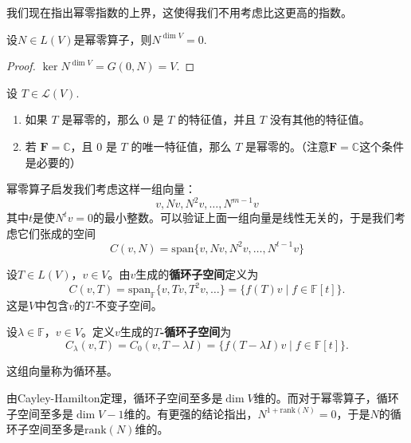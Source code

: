 我们现在指出幂零指数的上界，这使得我们不用考虑比这更高的指数。

\begin{theorem}[幂零指数的上界]
设$N \in L(V)$是幂零算子，则$N^{\dim V}=0$.
\end{theorem}

\begin{proof}
    $\ker N^{\dim V}=G(0, N)=V$.
\end{proof}
\begin{theorem}[幂零算子的特征值]
设 $T \in \mathcal{L}(V)$.

\begin{enumerate}
    \item[1.] 如果 $T$ 是幂零的，那么 $0$ 是 $T$ 的特征值，并且 $T$ 没有其他的特征值。
    \item[2.] 若 $\mathbf{F} = \mathbb{C}$，且 $0$ 是 $T$ 的唯一特征值，那么 $T$ 是幂零的。（注意$\mathbf{F} = \mathbb{C}$这个条件是必要的）
\end{enumerate}
\end{theorem}

幂零算子启发我们考虑这样一组向量：
\[
v,Nv,N^2v,\ldots,N^{m-1} v
\]
其中$t$是使$N^t v=0$的最小整数。可以验证上面一组向量是线性无关的，于是我们考虑它们张成的空间
\[
C(v,N)=\mathrm{span}\{v,Nv,N^2v,\ldots,N^{t-1}v\}
\]
\begin{definition}[循环子空间与循环模]
设$T \in L(V)$，$v \in V$。由$v$生成的\textbf{循环子空间}定义为
\[
C(v, T) = \mathrm{span}_{\mathbb{F}}\{v, Tv, T^2v, \ldots\} = \{f(T)v \mid f \in \mathbb{F}[t]\}.
\]
这是$V$中包含$v$的$T$-不变子空间。
\end{definition}

\begin{definition}[$T$-循环子空间]
设$\lambda \in \mathbb{F}$，$v \in V$。定义$v$生成的\textbf{$T$-循环子空间}为
\[
C_{\lambda}(v, T) = C_0(v, T-\lambda I) = \{f(T-\lambda I)v \mid f \in \mathbb{F}[t]\}.
\]
\end{definition}
这组向量称为循环基。

由Cayley-Hamilton定理，循环子空间至多是$\dim V$维的。而对于幂零算子，循环子空间至多是$\dim V-1$维的。有更强的结论指出，$N^{1+\mathrm{rank}(N)}=0$，于是$N$的循环子空间至多是$\mathrm{rank}(N)$维的。

